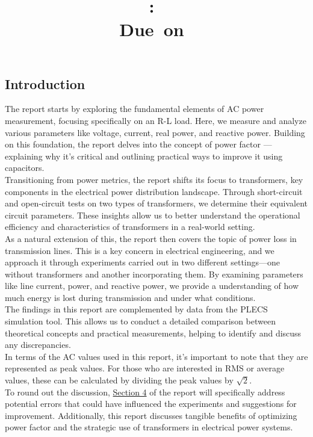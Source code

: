 \documentclass{article}
\title{
    \vspace{2in}
    \textmd{\textbf{\hmwkClass:\ \hmwkTitle}}\\
    \normalsize\vspace{0.1in}\small{Due\ on\ \hmwkDueDate}\\
}
\author{\hmwkAuthorName}
\date{}
\begin{document}
\maketitle

\pagebreak

\tableofcontents

\pagebreak

    \subsection{Introduction}
    The report starts by exploring the fundamental elements of AC power measurement, focusing specifically on an R-L load. Here, we measure and analyze various parameters like voltage, current, real power, and reactive power. Building on this foundation, the report delves into the concept of power factor — explaining why it's critical and outlining practical ways to improve it using capacitors.\\
    Transitioning from power metrics, the report shifts its focus to transformers, key components in the electrical power distribution landscape. Through short-circuit and open-circuit tests on two types of transformers, we determine their equivalent circuit parameters. These insights allow us to better understand the operational efficiency and characteristics of transformers in a real-world setting.\\
    As a natural extension of this, the report then covers the topic of power loss in transmission lines. This is a key concern in electrical engineering, and we approach it through experiments carried out in two different settings—one without transformers and another incorporating them. By examining parameters like line current, power, and reactive power, we provide a understanding of how much energy is lost during transmission and under what conditions.\\
    The findings in this report are complemented by data from the PLECS simulation tool. This allows us to conduct a detailed comparison between theoretical concepts and practical measurements, helping to identify and discuss any discrepancies.\\
    In terms of the AC values used in this report, it's important to note that they are represented as peak values. For those who are interested in RMS or average values, these can be calculated by dividing the peak values by $\sqrt{2}$.\\
    To round out the discussion, \hyperref[subsec:erors]{Section 4} of the report will specifically address potential errors that could have influenced the experiments and suggestions for improvement. Additionally, this report discusses tangible benefits of optimizing power factor and the strategic use of transformers in electrical power systems.
        
\end{document}
